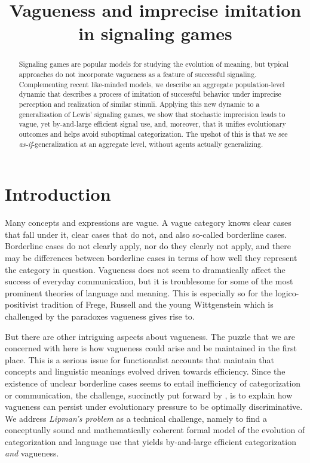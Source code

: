 \documentclass[fleqn,reqno,10pt]{article}
\title{Vagueness and imprecise imitation in signaling games}
\date{}
\begin{document}
\maketitle

\begin{abstract}
  Signaling games are popular models for studying the evolution of meaning, but typical
  approaches do not incorporate vagueness as a feature of successful signaling.  Complementing
  recent like-minded models, we describe an aggregate population-level dynamic that describes a
  process of imitation of successful behavior under imprecise perception and realization of
  similar stimuli. Applying this new dynamic to a generalization of Lewis' signaling games, we
  show that stochastic imprecision leads to vague, yet by-and-large efficient signal use, and,
  moreover, that it unifies evolutionary outcomes and helps avoid suboptimal
  categorization. The upshot of this is that we see \emph{as-if}-generalization at an aggregate
  level, without agents actually generalizing.
\end{abstract}

\section{Introduction}
\label{sec:introduction}

Many concepts and expressions are vague. A vague category knows clear
cases that fall under it, clear cases that do not, and also so-called
borderline cases. Borderline cases do not clearly apply, nor do they
clearly not apply, and there may be differences between borderline
cases in terms of how well they represent the category in
question. Vagueness does not seem to dramatically affect the success
of everyday communication, but it is troublesome for some of the most
prominent theories of language and meaning. This is especially so for the logico-positivist tradition of Frege, Russell and the young
Wittgenstein which is challenged by the paradoxes vagueness gives rise
to. 

But there are other intriguing aspects about vagueness. The puzzle
that we are concerned with here is how vagueness could arise and be
maintained in the first place. This is a serious issue for
functionalist accounts that maintain that concepts and linguistic
meanings evolved driven towards efficiency. Since the existence of
unclear borderline cases seems to entail inefficiency of
categorization or communication, the challenge, succinctly put forward
by \citet{Lipman2009:Why-is-Language}, is to explain how vagueness can
persist under evolutionary pressure to be optimally discriminative. We
address \emph{Lipman's problem} as a technical challenge, namely to
find a conceptually sound and mathematically coherent formal model of
the evolution of categorization and language use that yields
by-and-large efficient categorization \emph{and} vagueness.
\end{document}
